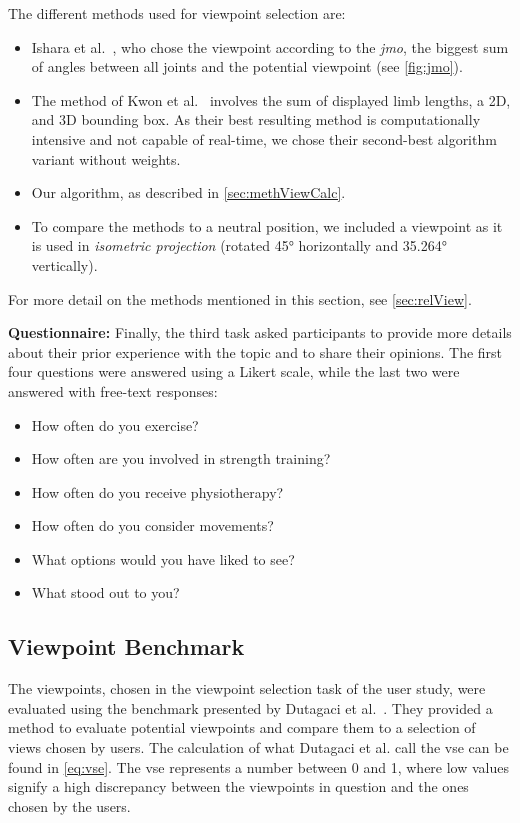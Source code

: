 The different methods used for viewpoint selection are:
\begin{itemize}
	\setlength{\itemsep}{-0.3cm}
	\item Ishara et al.~\cite{ishara2015mra}, who chose the viewpoint according to the \emph{\acrshort{jmo}}, the biggest sum of angles between all joints and the potential viewpoint (see \autoref{fig:jmo}).
	\item The method of Kwon et al.~\cite{kwon2020ocp} involves the sum of displayed limb lengths, a 2D, and 3D bounding box. As their best resulting method is computationally intensive and not capable of real-time, we chose their second-best algorithm variant without weights.
	\item Our algorithm, as described in \autoref{sec:methViewCalc}.
	\item  To compare the methods to a neutral position, we included a viewpoint as it is used in \emph{isometric projection} (rotated 45° horizontally and 35.264° vertically).
\end{itemize}
For more detail on the methods mentioned in this section, see \autoref{sec:relView}.

\textbf{Questionnaire:} Finally, the third task asked participants to provide more details about their prior experience with the topic and to share their opinions. The first four questions were answered using a Likert scale, while the last two were answered with free-text responses:

\begin{itemize}
	\setlength{\itemsep}{-0.3cm}
	\item How often do you exercise?
	\item How often are you involved in strength training?
	\item How often do you receive physiotherapy? 
	\item How often do you consider movements?
	\item What options would you have liked to see?
	\item What stood out to you?
\end{itemize} 

\subsection{Viewpoint Benchmark \label{sec:benchmark}}
The viewpoints, chosen in the viewpoint selection task of the user study, were evaluated using the benchmark presented by Dutagaci et al.~\cite{dutagaci2010bbv}. They provided a method to evaluate potential viewpoints and compare them to a selection of views chosen by users. The calculation of what Dutagaci et al. call the \acrfull{vse} can be found in \autoref{eq:vse}. The \acrshort{vse} represents a number between 0 and 1, where low values signify a high discrepancy between the viewpoints in question and the ones chosen by the users.

